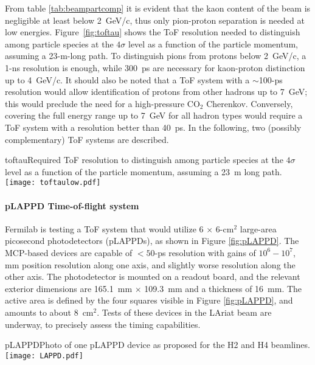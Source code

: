   From table \ref{tab:beampartcomp} it is evident that the kaon content of the beam is negligible at least below 2~GeV/c, thus  only pion-proton separation is needed at low energies. Figure~\ref{fig:toftau} shows the ToF resolution needed to distinguish among particle species at the $4\sigma$ level as a function of the particle momentum, assuming a 23-m-long path. To distinguish pions from protons below 2~GeV/c, a 1-ns resolution is enough, while 300~ps are necessary for kaon-proton distinction up to  4~GeV/c. It should also be noted that a ToF system with a $\sim$100-ps resolution would allow identification of protons from other hadrons up to 7~GeV; this would preclude the need for a %
  high-pressure CO$_2$ Cherenkov. %
  Conversely, covering %
  the full energy range up to 7~GeV for all hadron  types would require a ToF system with a resolution better than 40~ps. %
In the following, two (possibly complementary) ToF systems are described.
\begin{cdrfigure}{toftau}{Required ToF resolution to  distinguish among particle species at the $4\sigma$ level as a function of the particle momentum, assuming a 23~m long path. }
\texttt{[image: toftaulow.pdf]}
\end{cdrfigure}

\paragraph{pLAPPD Time-of-flight system}
Fermilab is testing a ToF system that would utilize %
6 $\times$ 6-cm$^2$
large-area picosecond photodetectors (pLAPPDs), as shown in Figure \ref{fig:pLAPPD}.
 The MCP-based devices
are capable of $< 50$-ps resolution with gains of $10^6-10^7$,
mm position resolution along one axis, and slightly worse resolution
along the other axis.  The photodetector is mounted on a readout
board, and the relevant exterior dimensions are 165.1~mm $\times$ 109.3~mm and a
thickness of 16~mm. The active area is defined by the four squares visible in Figure \ref{fig:pLAPPD}, and amounts to about 8~cm$^2$. Tests of these devices in the LAriat beam are underway, to precisely assess the timing capabilities. 
\begin{cdrfigure}[pLAPPD]{pLAPPD}{Photo of one pLAPPD device as proposed for the H2 and H4 beamlines.}
\texttt{[image: LAPPD.pdf]}
\end{cdrfigure}

